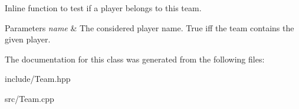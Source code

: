 \-Inline function to test if a player belongs to this team. 


\begin{DoxyParams}{\-Parameters}
{\em name} & \-The considered player name.  \-True iff the team contains the given player. \\
\hline
\end{DoxyParams}


\-The documentation for this class was generated from the following files\-:\begin{DoxyCompactItemize}
\item 
include/\-Team.\-hpp\item 
src/\-Team.\-cpp\end{DoxyCompactItemize}

